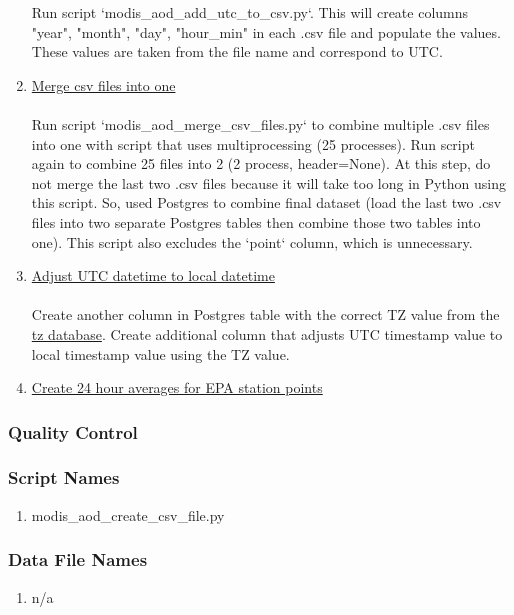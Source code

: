 \begin{enumerate}
Run script `modis\_aod\_add\_utc\_to\_csv.py`. This will create columns "year", "month", "day", "hour\_min" in each .csv file and populate the values. These values are taken from the file name and correspond to UTC.
\item \underline{Merge csv files into one}\\\\
Run script `modis\_aod\_merge\_csv\_files.py` to combine multiple .csv files into one with script that uses multiprocessing (25 processes). Run script again to combine 25 files into 2 (2 process, header=None). At this step, do not merge the last two .csv files because it will take too long in Python using this script. So, used Postgres to combine final dataset (load the last two .csv files into two separate Postgres tables then combine those two tables into one). This script also excludes the `point` column, which is unnecessary. 
\item \underline{Adjust UTC datetime to local datetime}\\\\
Create another column in Postgres table with the correct TZ value from the \href{https://en.wikipedia.org/wiki/List_of_tz_database_time_zones}{tz database}. Create additional column that adjusts UTC timestamp value to local timestamp value using the TZ value.
\item \underline{Create 24 hour averages for EPA station points}

\end{enumerate}

\subsubsection*{Quality Control}

\subsubsection*{Script Names}

\begin{enumerate}
\item modis\_aod\_create\_csv\_file.py
\end{enumerate}

\subsubsection*{Data File Names}

\begin{enumerate}
\item n/a
\end{enumerate}